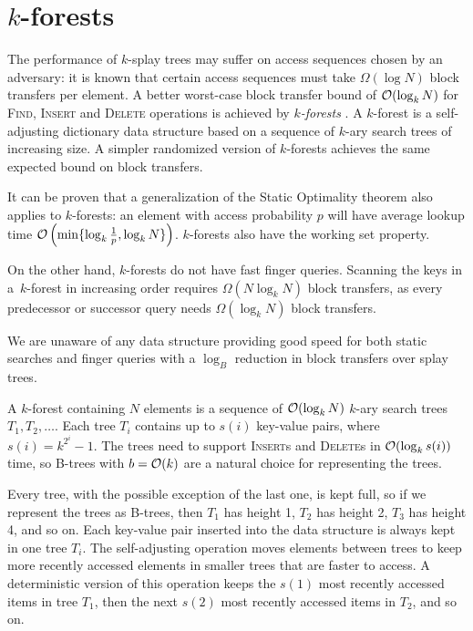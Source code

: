 \chapter{$k$-forests}
\label{chapter:kforest}
The performance of $k$-splay trees may suffer on access sequences chosen
by an adversary: it is known that certain access sequences must
take $\Omega(\log N)$ block transfers per element.
A better worst-case block transfer bound of $\mathcal{O}(\log_k N)$ for \textsc{Find},
\textsc{Insert} and \textsc{Delete} operations is achieved by \emph{$k$-forests} \cite{martel}.
A $k$-forest is a self-adjusting dictionary data structure based on a sequence
of $k$-ary search trees of increasing size. A simpler randomized version
of $k$-forests achieves the same expected bound on block transfers.

It can be proven that a generalization of the Static Optimality theorem
also applies to $k$-forests: an element with access probability $p$
will have average lookup time $\mathcal{O}\left(\min\{\log_k \frac{1}{p}, \log_k
N\}\right)$. $k$-forests also have the working set property.

On the other hand, $k$-forests do not have fast finger queries. Scanning
the keys in a~\mbox{$k$-forest} in increasing order requires
$\Omega(N\log_k N)$ block transfers, as every predecessor or successor query
needs $\Omega(\log_k N)$ block transfers.

We are unaware of any data structure providing good speed for both static
searches and finger queries with a $\log_B$ reduction in block transfers
over splay trees.

A $k$-forest containing $N$ elements is a sequence of $\mathcal{O}(\log_k N)$ $k$-ary
search trees $T_1, T_2, \ldots$. Each tree $T_i$ contains up to $s(i)$ key-value
pairs, where $s(i) = k^{2^i} - 1$. The trees need to support \textsc{Insert}s
and \textsc{Delete}s in $\mathcal{O}(\log_k s(i))$ time, so \mbox{B-trees} with
$b=\mathcal{O}(k)$ are a natural choice for representing the trees.

Every tree, with the possible exception of the last one, is kept full,
so if we represent the trees as \mbox{B-trees}, then $T_1$ has height 1,
$T_2$ has height 2, $T_3$ has height 4, and so on.
Each key-value pair inserted into the data structure is always kept in one
tree $T_i$. The self-adjusting operation moves elements between trees to
keep more recently accessed elements in smaller trees that are faster
to access. A deterministic version of this operation keeps the $s(1)$ most
recently accessed items in tree $T_1$, then the next $s(2)$ most recently
accessed items in $T_2$, and so on.


